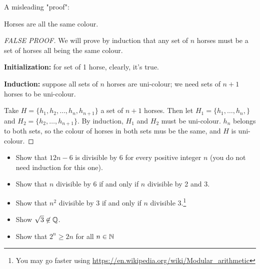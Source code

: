 A misleading "proof":
\begin{property}
    Horses are all the same colour.
\end{property}
\begin{proof}[FALSE PROOF]
    We will prove by induction that any set of $n$ horses must be a set of horses all being the same colour.
    
    \textbf{Initialization:} for set of 1 horse, clearly, it's true.
    
    \textbf{Induction:} suppose all sets of $n$ horses are uni-colour; we need sets of $n+1$ horses to be uni-colour.
    
    Take $H=\{ h_1, h_2, \dots, h_n, h_{n+1} \}$ a set of $n+1$ horses.
    Then let $H_1 = \{ h_1, \dots, h_n, \}$ and $H_2 = \{ h_2, \dots, h_{n+1} \}$.
    By induction, $H_1$ and $H_2$ must be uni-colour.
    $h_n$ belongs to both sets, so the colour of horses in both sets mus be the same, and $H$ is uni-colour.
\end{proof}

\begin{question}
    \begin{itemize}
        \item Show that $12n-6$ is divisible by 6 for every positive integer $n$ (you do not need induction for this one).
        \item Show that $n$ divisible by 6 if and only if $n$ divisible by 2 and 3.
        \item Show that $n^2$ divisible by 3 if and only if $n$ divisible 3.\footnote{You may go faster using \url{https://en.wikipedia.org/wiki/Modular_arithmetic}}
        \item Show $\sqrt{3} \not\in \mathbb{Q}$.
        \item Show that $2^n \geq 2n$ for all $n \in \mathbb{N}$
    \end{itemize}
\end{question}




